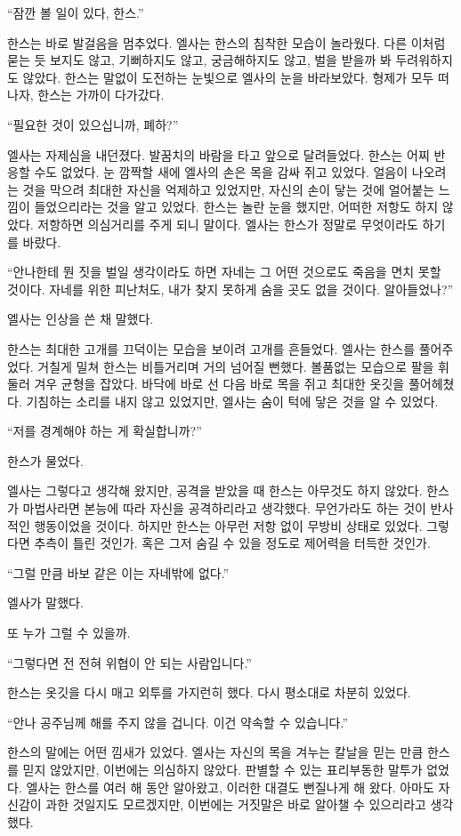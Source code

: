``잠깐 볼 일이 있다, 한스.''

한스는 바로 발걸음을 멈추었다. 엘사는 한스의 침착한 모습이 놀라웠다. 다른 이처럼 묻는 듯 보지도 않고, 기뻐하지도 않고, 궁금해하지도 않고, 벌을 받을까 봐 두려워하지도 않았다. 한스는 말없이 도전하는 눈빛으로 엘사의 눈을 바라보았다. 형제가 모두 떠나자, 한스는 가까이 다가갔다.

``필요한 것이 있으십니까, 폐하?''

엘사는 자제심을 내던졌다. 발꿈치의 바람을 타고 앞으로 달려들었다. 한스는 어찌 반응할 수도 없었다. 눈 깜짝할 새에 엘사의 손은 목을 감싸 쥐고 있었다. 얼음이 나오려는 것을 막으려 최대한 자신을 억제하고 있었지만, 자신의 손이 닿는 것에 얼어붙는 느낌이 들었으리라는 것을 알고 있었다. 한스는 놀란 눈을 했지만, 어떠한 저항도 하지 않았다. 저항하면 의심거리를 주게 되니 말이다. 엘사는 한스가 정말로 무엇이라도 하기를 바랐다.

``안나한테 뭔 짓을 벌일 생각이라도 하면 자네는 그 어떤 것으로도 죽음을 면치 못할 것이다. 자네를 위한 피난처도, 내가 찾지 못하게 숨을 곳도 없을 것이다. 알아들었나?''

엘사는 인상을 쓴 채 말했다.

한스는 최대한 고개를 끄덕이는 모습을 보이려 고개를 흔들었다. 엘사는 한스를 풀어주었다. 거칠게 밀쳐 한스는 비틀거리며 거의 넘어질 뻔했다. 볼품없는 모습으로 팔을 휘둘러 겨우 균형을 잡았다. 바닥에 바로 선 다음 바로 목을 쥐고 최대한 옷깃을 풀어헤쳤다. 기침하는 소리를 내지 않고 있었지만, 엘사는 숨이 턱에 닿은 것을 알 수 있었다.

``저를 경계해야 하는 게 확실합니까?''

한스가 물었다.

엘사는 그렇다고 생각해 왔지만, 공격을 받았을 때 한스는 아무것도 하지 않았다. 한스가 마법사라면 본능에 따라 자신을 공격하리라고 생각했다. 무언가라도 하는 것이 반사적인 행동이었을 것이다. 하지만 한스는 아무런 저항 없이 무방비 상태로 있었다. 그렇다면 추측이 틀린 것인가. 혹은 그저 숨길 수 있을 정도로 제어력을 터득한 것인가.

``그럴 만큼 바보 같은 이는 자네밖에 없다.''

엘사가 말했다.

또 누가 그럴 수 있을까.

``그렇다면 전 전혀 위협이 안 되는 사람입니다.''

한스는 옷깃을 다시 매고 외투를 가지런히 했다. 다시 평소대로 차분히 있었다.

``안나 공주님께 해를 주지 않을 겁니다. 이건 약속할 수 있습니다.''

한스의 말에는 어떤 낌새가 있었다. 엘사는 자신의 목을 겨누는 칼날을 믿는 만큼 한스를 믿지 않았지만, 이번에는 의심하지 않았다. 판별할 수 있는 표리부동한 말투가 없었다. 엘사는 한스를 여러 해 동안 알아왔고, 이러한 대결도 뻔질나게 해 왔다. 아마도 자신감이 과한 것일지도 모르겠지만, 이번에는 거짓말은 바로 알아챌 수 있으리라고 생각했다.


